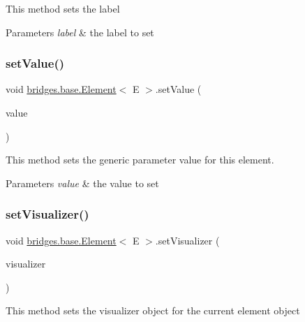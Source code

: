 This method sets the label


\begin{DoxyParams}{Parameters}
{\em label} & the label to set \\
\hline
\end{DoxyParams}
\hypertarget{classbridges_1_1base_1_1_element_ab3cf1241da0bc4c59cea9d6f0fd7aaf4}{}\label{classbridges_1_1base_1_1_element_ab3cf1241da0bc4c59cea9d6f0fd7aaf4} 
\subsubsection{\texorpdfstring{set\+Value()}{setValue()}}
{\footnotesize\ttfamily void \hyperlink{classbridges_1_1base_1_1_element}{bridges.\+base.\+Element}$<$ E $>$.set\+Value (\begin{DoxyParamCaption}\item[{E}]{value }\end{DoxyParamCaption})}

This method sets the generic parameter value for this element.


\begin{DoxyParams}{Parameters}
{\em value} & the value to set \\
\hline
\end{DoxyParams}
\hypertarget{classbridges_1_1base_1_1_element_a5befa95788099f1bc72cdf5361c55bed}{}\label{classbridges_1_1base_1_1_element_a5befa95788099f1bc72cdf5361c55bed} 
\subsubsection{\texorpdfstring{set\+Visualizer()}{setVisualizer()}}
{\footnotesize\ttfamily void \hyperlink{classbridges_1_1base_1_1_element}{bridges.\+base.\+Element}$<$ E $>$.set\+Visualizer (\begin{DoxyParamCaption}\item[{\hyperlink{classbridges_1_1base_1_1_element_visualizer}{Element\+Visualizer}}]{visualizer }\end{DoxyParamCaption})}

This method sets the visualizer object for the current element object


